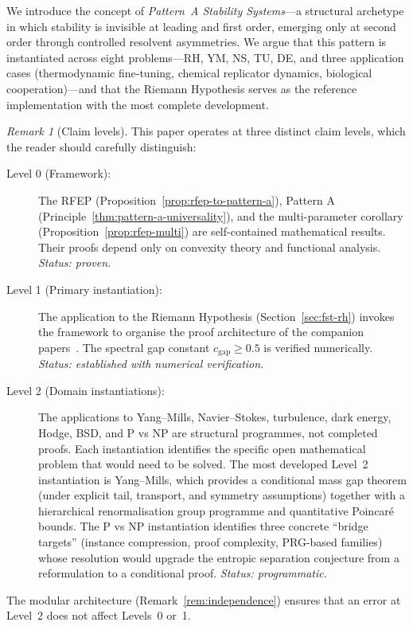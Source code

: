 \documentclass[12pt,a4paper]{article}
\theoremstyle{definition}
\theoremstyle{remark}
\newtheorem{remark}[theorem]{Remark}
\begin{document}
We introduce the concept of \emph{Pattern~A Stability Systems}---a structural archetype in which stability is invisible at leading and first order, emerging only at second order through controlled resolvent asymmetries. We argue that this pattern is instantiated across eight problems---RH, YM, NS, TU, DE, and three application cases (thermodynamic fine-tuning, chemical replicator dynamics, biological cooperation)---and that the Riemann Hypothesis serves as the reference implementation with the most complete development.

\begin{remark}[Claim levels]
\label{rem:claim-levels}
This paper operates at three distinct claim levels, which the reader should carefully distinguish:
\begin{description}
\item[Level 0 (Framework):] The RFEP (Proposition~\ref{prop:rfep-to-pattern-a}), Pattern A (Principle~\ref{thm:pattern-a-universality}), and the multi-parameter corollary (Proposition~\ref{prop:rfep-multi}) are self-contained mathematical results. Their proofs depend only on convexity theory and functional analysis. \emph{Status: proven.}
\item[Level 1 (Primary instantiation):] The application to the Riemann Hypothesis (Section~\ref{sec:fst-rh}) invokes the framework to organise the proof architecture of the companion papers~\cite{Geiger2026a,Geiger2026b,Geiger2026c}. The spectral gap constant $c_{\mathrm{gap}} \geq 0.5$ is verified numerically. \emph{Status: established with numerical verification.}
\item[Level 2 (Domain instantiations):] The applications to Yang--Mills, Navier--Stokes, turbulence, dark energy, Hodge, BSD, and P vs NP are structural programmes, not completed proofs. Each instantiation identifies the specific open mathematical problem that would need to be solved. The most developed Level~2 instantiation is Yang--Mills, which provides a conditional mass gap theorem (under explicit tail, transport, and symmetry assumptions) together with a hierarchical renormalisation group programme and quantitative Poincar\'e bounds. The P vs NP instantiation identifies three concrete ``bridge targets'' (instance compression, proof complexity, PRG-based families) whose resolution would upgrade the entropic separation conjecture from a reformulation to a conditional proof. \emph{Status: programmatic.}
\end{description}
The modular architecture (Remark~\ref{rem:independence}) ensures that an error at Level~2 does not affect Levels~0 or~1.
\end{remark}
\end{document}
